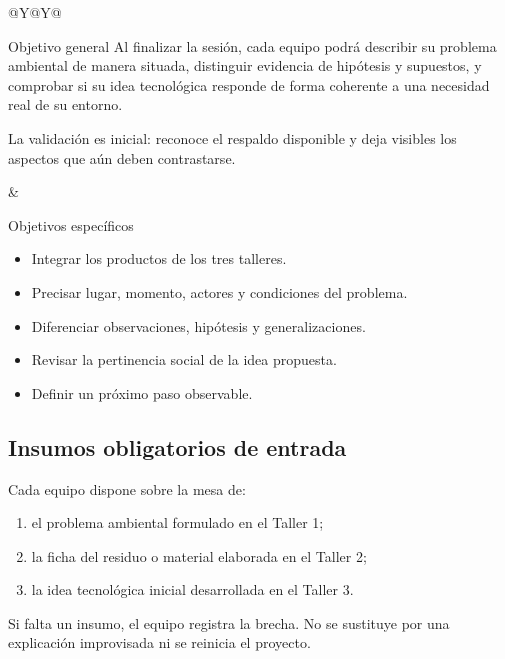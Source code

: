 \documentclass[10pt,a4paper]{article}
\begin{document}
\begin{tabularx}{\textwidth}{@{}Y@{\hspace{5mm}}Y@{}}
\begin{docbox}[height=61mm]{Objetivo general}
Al finalizar la sesión, cada equipo podrá describir su problema ambiental de manera situada, distinguir evidencia de hipótesis y supuestos, y comprobar si su idea tecnológica responde de forma coherente a una necesidad real de su entorno.

\vspace{2mm}
La validación es inicial: reconoce el respaldo disponible y deja visibles los aspectos que aún deben contrastarse.
\end{docbox}
&
\begin{docbox}[height=61mm]{Objetivos específicos}
\begin{itemize}
  \item Integrar los productos de los tres talleres.
  \item Precisar lugar, momento, actores y condiciones del problema.
  \item Diferenciar observaciones, hipótesis y generalizaciones.
  \item Revisar la pertinencia social de la idea propuesta.
  \item Definir un próximo paso observable.
\end{itemize}
\end{docbox}
\end{tabularx}

\subsection{Insumos obligatorios de entrada}
Cada equipo dispone sobre la mesa de:
\begin{enumerate}
  \item el problema ambiental formulado en el Taller 1;
  \item la ficha del residuo o material elaborada en el Taller 2;
  \item la idea tecnológica inicial desarrollada en el Taller 3.
\end{enumerate}

Si falta un insumo, el equipo registra la brecha. No se sustituye por una explicación improvisada ni se reinicia el proyecto.
\end{document}
